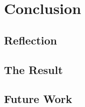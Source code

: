 \clearpage
\section{Conclusion}

\subsection{Reflection}

\subsection{The Result}

\subsection{Future Work}
